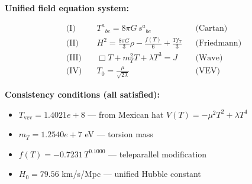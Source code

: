
\textbf{Unified field equation system:}

\begin{align}
  \text{(I)} \quad & T^a{}_{bc} = 8\pi G \, s^a{}_{bc} && \text{(Cartan)} \\
  \text{(II)} \quad & H^2 = \frac{8\pi G}{3}\rho - \frac{f(T)}{6} + \frac{Tf_T}{3} && \text{(Friedmann)} \\
  \text{(III)} \quad & \Box T + m_T^2 T + \lambda T^3 = J && \text{(Wave)} \\
  \text{(IV)} \quad & T_0 = \frac{\mu}{\sqrt{2\lambda}} && \text{(VEV)}
\end{align}

\textbf{Consistency conditions (all satisfied):}
\begin{itemize}
  \item $T_{\text{vev}} = 1.4021e+8$ — from Mexican hat $V(T) = -\mu^2 T^2 + \lambda T^4$
  \item $m_T = 1.2540e+7$ eV — torsion mass
  \item $f(T) = -0.7231 \, T^{0.1000}$ — teleparallel modification
  \item $H_0 = 79.56$ km/s/Mpc — unified Hubble constant
\end{itemize}
